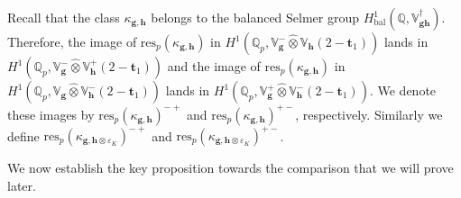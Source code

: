 \documentclass[a4paper,11pt]{amsart}
\theoremstyle{plain}
\theoremstyle{definition}
\newtheorem{defi}[theorem]{Definition}
\newtheorem{ass}[theorem]{Assumption}
\theoremstyle{remark}
\newcommand{\bb}{\mathbb}
\DeclareMathOperator{\bal}{bal}
\newcommand{\hg}{{\mathbf{g}}}
\newcommand{\hh}{{\mathbf h}}
\newcommand{\res}{\mathrm{res}}
\numberwithin{equation}{section}
\begin{document}

Recall that the class $\kappa_{\hg,\hh}$ belongs to the balanced Selmer group $H^1_{\bal}(\bb{Q},\bb{V}_{\hg\hh}^\dagger)$. Therefore, the image of $\res_p(\kappa_{\hg,\hh})$ in $H^1(\bb{Q}_p,\bb{V}_{\hg}^-\hat{\otimes}\bb{V}_{\hh}(2-\mathbf{t}_1))$ lands in $H^1(\bb{Q}_p,\bb{V}_{\hg}^-\hat{\otimes}\bb{V}_{\hh}^+(2-\mathbf{t}_1))$ and the image of $\res_p(\kappa_{\hg,\hh})$ in $H^1(\bb{Q}_p,\bb{V}_{\hg}\hat{\otimes}\bb{V}_{\hh}^-(2-\mathbf{t}_1))$ lands in $H^1(\bb{Q}_p,\bb{V}_{\hg}^+\hat{\otimes}\bb{V}_{\hh}^-(2-\mathbf{t}_1))$. We denote these images by $\res_p(\kappa_{\hg,\hh})^{-+}$ and $\res_p(\kappa_{\hg,\hh})^{+-}$, respectively. Similarly we define $\res_p(\kappa_{\hg,\hh\otimes\varepsilon_K})^{-+}$ and $\res_p(\kappa_{\hg,\hh\otimes\varepsilon_K})^{+-}$.



We now establish the key proposition towards the comparison that we will prove later.
\end{document}
